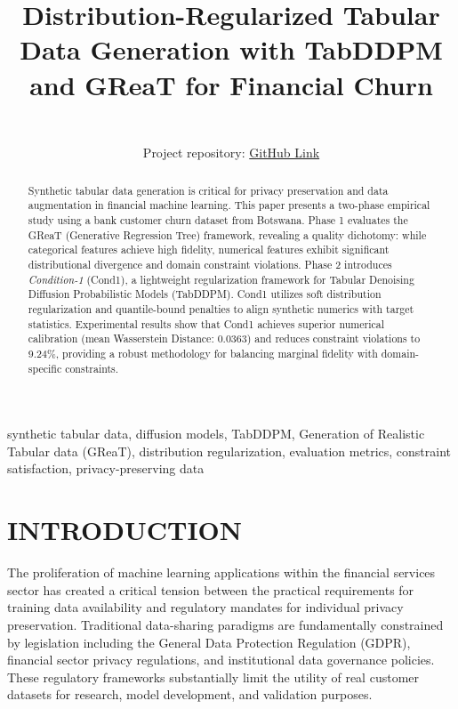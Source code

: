 \documentclass[10pt,conference,a4paper]{IEEEtran}
\begin{document}
\title{Distribution-Regularized Tabular Data Generation with TabDDPM and GReaT for Financial Churn

\author{
    \\
     {Project repository: \href{https://github.com/Tharunchanda/Gen-AI-TabDDPM_GReaT-Project}{GitHub Link}}}
}

\maketitle

\begin{abstract}
Synthetic tabular data generation is critical for privacy preservation and data augmentation in financial machine learning. This paper presents a two-phase empirical study using a bank customer churn dataset from Botswana. Phase 1 evaluates the GReaT (Generative Regression Tree) framework, revealing a quality dichotomy: while categorical features achieve high fidelity, numerical features exhibit significant distributional divergence and domain constraint violations. Phase 2 introduces \textit{Condition-1} (Cond1), a lightweight regularization framework for Tabular Denoising Diffusion Probabilistic Models (TabDDPM). Cond1 utilizes soft distribution regularization and quantile-bound penalties to align synthetic numerics with target statistics. Experimental results show that Cond1 achieves superior numerical calibration (mean Wasserstein Distance: 0.0363) and reduces constraint violations to 9.24\%, providing a robust methodology for balancing marginal fidelity with domain-specific constraints.
\end{abstract}

\begin{IEEEkeywords}
synthetic tabular data, diffusion models, TabDDPM, Generation of Realistic Tabular data (GReaT), distribution regularization, evaluation metrics, constraint satisfaction, privacy-preserving data
\end{IEEEkeywords}

\section{INTRODUCTION}
The proliferation of machine learning applications within the financial services sector has created a critical tension between the practical requirements for training data availability and regulatory mandates for individual privacy preservation. Traditional data-sharing paradigms are fundamentally constrained by legislation including the General Data Protection Regulation (GDPR), financial sector privacy regulations, and institutional data governance policies. These regulatory frameworks substantially limit the utility of real customer datasets for research, model development, and validation purposes. 
\end{document}
